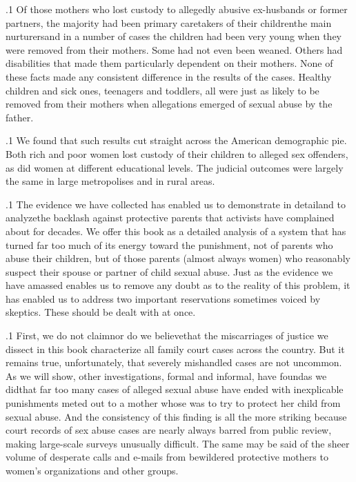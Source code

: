 \documentclass[11pt, twoside]{article}
\begin{document}
{\p.1{%
Of those mothers who lost custody to allegedly abusive ex-husbands
or former partners, the majority had been primary caretakers of their
children\mdash{}the main nurturers\mdash{}and in a number of cases the children
had been very young when they were removed from their mothers. Some
had not even been weaned. Others had disabilities that made them particularly dependent on their mothers. None of these facts made any
consistent difference in the results of the cases. Healthy children and
sick ones, teenagers and toddlers, all were just as likely to be removed
from their mothers when allegations emerged of sexual abuse by the
father.
}%

\p.1{%
We found that such results cut straight across the American demographic pie. Both rich and poor women lost custody of their children
to alleged sex offenders, as did women at different educational levels.
The judicial outcomes were largely the same in large metropolises and
in rural areas.
}%

\p.1{%
The evidence we have collected has enabled us to demonstrate in
detail\mdash{}and to analyze\mdash{}the backlash against protective parents that
activists have complained about for decades. We offer this book as a
detailed analysis of a system that has turned far too much of its energy
toward the punishment, not of parents who abuse their children, but
of those parents (almost always women) who reasonably suspect their
spouse or partner of child sexual abuse.
Just as the evidence we have amassed enables us to remove any doubt
as to the reality of this problem, it has enabled us to address two important reservations sometimes voiced by skeptics. These should be dealt
with at once.
}%

\p.1{%
First, we do not claim\mdash{}nor do we believe\mdash{}that the miscarriages of
justice we dissect in this book characterize all family court cases across
the country. But it remains true, unfortunately, that severely mishandled cases are not uncommon. As we will show, other investigations,
formal and informal, have found\mdash{}as we did\mdash{}that far too many cases of
alleged sexual abuse have ended with inexplicable punishments meted
out to a mother whose  was to try to protect her child from sexual
abuse. And the consistency of this finding is all the more striking because
court records of sex abuse cases are nearly always barred from public
review, making large-scale surveys unusually difficult. The same may be
said of the sheer volume of desperate calls and e-mails from bewildered
protective mothers to women’s organizations and other groups.
}%

}
\end{document}
